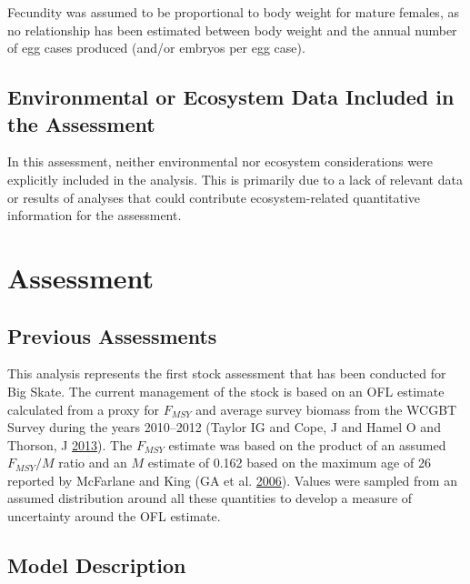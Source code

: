 \documentclass[12pt,]{article}
\begin{document}
Fecundity was assumed to be proportional to body weight for mature
females, as no relationship has been estimated between body weight and
the annual number of egg cases produced (and/or embryos per egg case).

\vspace{.5cm}

\hypertarget{environmental-or-ecosystem-data-included-in-the-assessment}{%
\subsection{Environmental or Ecosystem Data Included in the
Assessment}\label{environmental-or-ecosystem-data-included-in-the-assessment}}

In this assessment, neither environmental nor ecosystem considerations
were explicitly included in the analysis. This is primarily due to a
lack of relevant data or results of analyses that could contribute
ecosystem-related quantitative information for the assessment.

\newpage

\hypertarget{assessment}{%
\section{Assessment}\label{assessment}}

\hypertarget{previous-assessments}{%
\subsection{Previous Assessments}\label{previous-assessments}}

This analysis represents the first stock assessment that has been
conducted for Big Skate. The current management of the stock is based on
an OFL estimate calculated from a proxy for \(F_{MSY}\) and average
survey biomass from the WCGBT Survey during the years 2010--2012 (Taylor
IG and Cope, J and Hamel O and Thorson, J
\protect\hyperlink{ref-Taylor2013}{2013}). The \(F_{MSY}\) estimate was
based on the product of an assumed \(F_{MSY}/M\) ratio and an \(M\)
estimate of 0.162 based on the maximum age of 26 reported by McFarlane
and King (GA et al. \protect\hyperlink{ref-McFandKing2006}{2006}).
Values were sampled from an assumed distribution around all these
quantities to develop a measure of uncertainty around the OFL estimate.

\hypertarget{model-description}{%
\subsection{Model Description}\label{model-description}}
\end{document}
